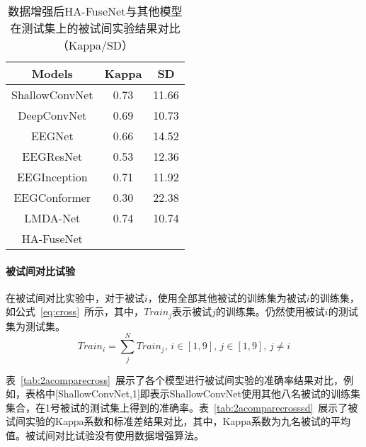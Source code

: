 \begin{table}[ht]
    \centering
    \caption{数据增强后HA-FuseNet与其他模型在测试集上的被试间实验结果对比（Kappa/SD）}
    \label{tab:2acompareagsd}
    \begin{tabularx}{\textwidth}{CCC}
      \toprule
      Models & Kappa & SD \\
      \midrule
      ShallowConvNet\cite{schirrmeister2017deep} & 0.73 & 11.66 \\
      DeepConvNet\cite{schirrmeister2017deep} & 0.69 & 10.73 \\
      EEGNet\cite{lawhern2018eegnet} & 0.66 & 14.52 \\
      EEGResNet\cite{HBM:HBM23730} & 0.53 & 12.36 \\
      EEGInception\cite{zhang2021eeg} & 0.71 & 11.92 \\
      EEGConformer\cite{song2022eeg} & 0.30 & 22.38 \\
      LMDA-Net\cite{miao2023lmda} & 0.74 & 10.74 \\
      \midrule 
      HA-FuseNet \\
      \bottomrule
    \end{tabularx}
\end{table}

\paragraph{被试间对比试验}

在被试间对比实验中，对于被试\(i\)，使用全部其他被试的训练集为被试\(i\)的训练集，如公式~\ref{eq:cross}~所示，其中，\(Train_j\)表示被试\(j\)的训练集。仍然使用被试\(i\)的测试集为测试集。
\begin{equation}
    \label{eq:cross}
    Train_i=\sum_{j}^{N}Train_j,\,i \in [1,9],\,j \in [1,9],\,j \neq i
\end{equation}

表~\ref{tab:2acomparecross}~展示了各个模型进行被试间实验的准确率结果对比，例如，表格中[ShallowConvNet,1]即表示ShallowConvNet使用其他八名被试的训练集集合，在1号被试的测试集上得到的准确率。表~\ref{tab:2acomparecrosssd}~展示了被试间实验的Kappa系数和标准差结果对比，其中，Kappa系数为九名被试的平均值。被试间对比试验没有使用数据增强算法。

